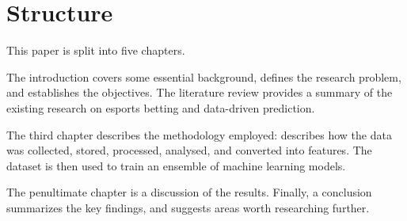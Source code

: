 \section{Structure}

This paper is split into five chapters.

The introduction covers some essential background, defines the research problem, and establishes the objectives. The literature review provides a summary of the existing research on esports betting and data-driven prediction. 

The third chapter describes the methodology employed: describes how the data was collected, stored, processed, analysed, and converted into features.  The dataset is then used to train an ensemble of machine learning models. 

The penultimate chapter is a discussion of the results. Finally, a conclusion summarizes the key findings, and suggests areas worth researching further.


%


